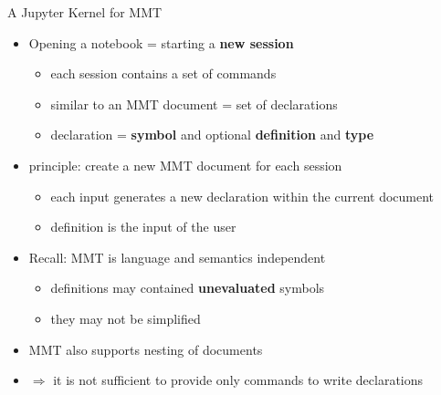 \documentclass{beamer}
\begin{document}
    \begin{frame}{A Jupyter Kernel for MMT}
        \begin{itemize}
            \item Opening a notebook = starting a \textbf{new session}
            \begin{itemize}
                \item each session contains a set of commands
                \item similar to an MMT document = set of declarations
                \item declaration = \textbf{symbol} and optional \textbf{definition} and \textbf{type}
            \end{itemize}
            \item principle: create a new MMT document for each session
            \begin{itemize}
                \item each input generates a new declaration within the current document
                \item definition is the input of the user
            \end{itemize}
            \item Recall: MMT is language and semantics independent
            \begin{itemize}
                \item definitions may contained \textbf{unevaluated} symbols
                \item they may not be simplified
            \end{itemize}
            \item MMT also supports nesting of documents
            \item $\Rightarrow$ it is not sufficient to provide only commands to write declarations
        \end{itemize}
    \end{frame}
\end{document}

